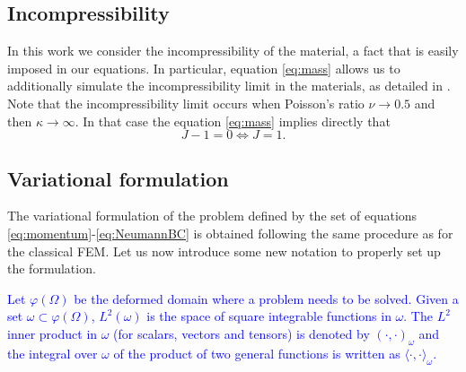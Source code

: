 \documentclass[11pt,english]{article}
\newcommand{\LM}[1]{\textcolor{blue}{#1}}
\def\InitialDomain{\Omega}
\def\DeformedDomain{\varphi(\InitialDomain)}
\begin{document}
   \subsection{Incompressibility}
In this work we consider the incompressibility of the material, a fact that is easily imposed in our equations. In particular, equation \eqref{eq:mass}  allows us to additionally simulate the incompressibility limit in the materials, as detailed in \cite{castanar2020stabilized}. Note that the incompressibility limit occurs when Poisson's ratio $\nu \rightarrow 0.5$ and then $\kappa \rightarrow \infty$. In that case the equation \eqref{eq:mass} implies directly that $$ J-1=0 \Leftrightarrow J=1.$$

    \subsection{Variational formulation}
    The variational formulation of the problem defined by the set of equations \eqref{eq:momentum}-\eqref{eq:NeumannBC} is obtained following the same procedure as for the classical FEM. Let us now introduce some new notation to properly set up the formulation.
    
\LM{Let $\DeformedDomain$ be the deformed domain where a problem needs to be solved. Given a set $\omega\subset \DeformedDomain$, $L^{2}(\omega)$ is the space of square integrable functions in $\omega$. The $L^{2}$ inner product in $\omega$ (for scalars, vectors and tensors) is denoted by $(\cdot,\cdot)_{\omega}$ and the integral over $\omega$ of the product of two general functions is written as $\langle\cdot,\cdot\rangle_{\omega}$.} 
     
\end{document}
